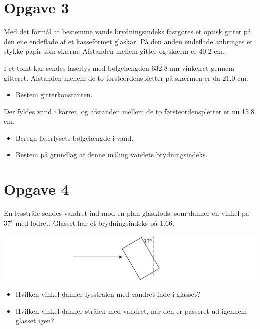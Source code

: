 \documentclass[a4paper, 12pt]{article}
\begin{document}
\section*{Opgave 3}
\label{sec:orga83560a}

Med det formål at bestemme vands brydningsindeks fastgøres et optisk gitter på den ene endeflade af et kasseformet glaskar. På den anden endeflade anbringes et stykke papir som skærm. Afstanden mellem gitter og skærm er 40.2 cm.

I et tomt kar sendes laserlys med bølgelængden 632.8 nm vinkelret gennem gitteret. Afstanden mellem de to førsteordenspletter på skærmen er da 21.0 cm.

\begin{itemize}
\item Bestem gitterkonstanten.
\end{itemize}

Der fyldes vand i karret, og afstanden mellem de to førsteordenspletter er nu 15.8 cm.

\begin{itemize}
\item Beregn laserlysets bølgelængde i vand.

\item Bestem på grundlag af denne måling vandets brydningsindeks.
\end{itemize}

\section*{Opgave 4}
\label{sec:org624790b}

En lysstråle sendes vandret ind mod en plan glasklods, som danner en vinkel på \(37^\circ\) med lodret. Glasset har et brydningsindeks på 1.66.

\begin{center}
\includegraphics[width=.9\linewidth]{./img/glasklods.png}
\end{center}

\begin{itemize}
\item Hvilken vinkel danner lysstrålen med vandret inde i glasset?

\item Hvilken vinkel danner strålen med vandret, når den er passeret ud igennem glasset igen?
\end{itemize}
\end{document}
